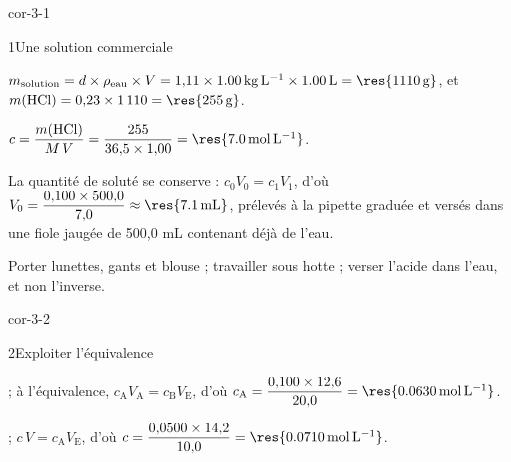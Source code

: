 \corrigesSouples

\begin{blocLivre}{cor-3-1}
\begin{corrige}{1}{Une solution commerciale}
\begin{questions}
\item $m_\text{solution}=d\times\rho_\text{eau}\times V=1{,}11\times\qty{1,00}{kg.L^{-1}}\times\qty{1,00}{L}=\res{\qty{1110}{g}}$,
et $m(\ce{HCl})=0{,}23\times1\,110=\res{\qty{255}{g}}$.
\item $c=\dfrac{m(\ce{HCl})}{M\,V}=\dfrac{255}{36{,}5\times1{,}00}=\res{\qty{7,0}{mol.L^{-1}}}$.
\item La quantité de soluté se conserve : $c_0V_0=c_1V_1$, d'où $V_0=\dfrac{0{,}100\times500{,}0}{7{,}0}\approx\res{\qty{7,1}{mL}}$,
prélevés à la pipette graduée et versés dans une fiole jaugée de 500,0 mL contenant déjà de l'eau.
\item Porter lunettes, gants et blouse ; travailler sous hotte ; verser l'acide dans l'eau, et non l'inverse.
\end{questions}
\end{corrige}
\end{blocLivre}
\begin{blocLivre}{cor-3-2}
\begin{corrige}{2}{Exploiter l'équivalence}
\begin{questions}
\item {} ; à l'équivalence, $c_\mathrm{A}V_\mathrm{A}=c_\mathrm{B}V_\mathrm{E}$, d'où
$c_\mathrm{A}=\dfrac{0{,}100\times12{,}6}{20{,}0}=\res{\qty{0,0630}{mol.L^{-1}}}$.
\item {} ; $c\,V=c_\mathrm{A}V_\mathrm{E}$, d'où
$c=\dfrac{0{,}0500\times14{,}2}{10{,}0}=\res{\qty{0,0710}{mol.L^{-1}}}$.
\end{questions}
\end{corrige}
\end{blocLivre}
